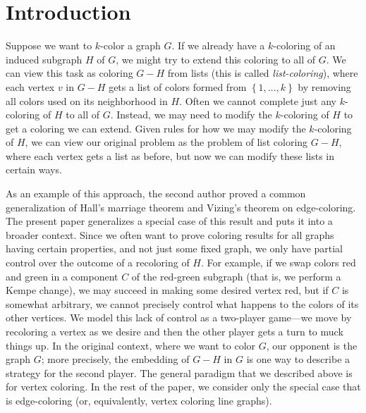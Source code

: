 \documentclass[12pt]{article}
\theoremstyle{plain}
\theoremstyle{definition}
\theoremstyle{remark}
\newcommand{\set}[1]{\left\{ #1 \right\}}
\begin{document}
\section{Introduction}
Suppose we want to $k$-color a graph $G$. If we already have a $k$-coloring of
an induced subgraph $H$ of $G$, we might try to extend this coloring to all of
$G$.  We can view this task as coloring $G-H$ from lists (this is called
\emph{list-coloring}), where each vertex $v$ in $G-H$ gets a list of colors
formed from $\set{1, \ldots, k}$ by removing all colors used on its
neighborhood in $H$.  
Often we cannot complete just any $k$-coloring of $H$ to all of
$G$.  Instead, we may need to modify the $k$-coloring of $H$ to get a coloring
we can extend.  Given rules for how we may modify the $k$-coloring
of $H$, we can view our original problem
as the problem of list coloring $G-H$, where each
vertex gets a list as before, but now we can modify these lists in certain ways.

As an example of this approach, the second author proved \cite{HallGame} 
a common generalization of Hall's marriage theorem and Vizing's theorem on
edge-coloring.  The present paper generalizes a special case of this result and
puts it into a broader context.  
Since we often want to prove coloring results for all graphs having
certain properties, and not just some fixed graph, we only have partial control
over the outcome of a recoloring of $H$. For example, if we swap colors red and
green in a component $C$ of the red-green subgraph (that is, we perform a Kempe
change), we may succeed in making some desired vertex red,
but if $C$ is somewhat arbitrary, we cannot precisely control what happens
to the colors of its other vertices.  %
We model this lack of control as a two-player game---we move by %
recoloring a vertex as we desire and then the other player gets a turn to muck things up. 
In the original context, where we want to color $G$, our opponent is the graph
$G$; more precisely, the embedding of $G-H$ in $G$ is one way to describe a
strategy for the second player. The general paradigm that we described above is
for vertex coloring.  In the rest of the paper, we consider only the special
case that is edge-coloring (or, equivalently, vertex coloring line graphs).  
\end{document}
